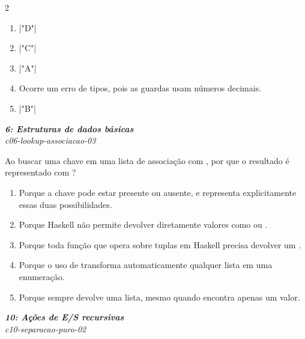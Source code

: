 \documentclass[a4paper,10pt,brazil]{article}
\begin{document}
\begin{multicols}{2}
\begin{enumerate}
  \item \haskellinline|"D"|

  \item \haskellinline|"C"|

  \item \haskellinline|"A"|

  \item Ocorre um erro de tipos, pois as guardas usam números decimais.

  \item \haskellinline|"B"|


\end{enumerate}

\begin{flushright}
  \footnotesize
  \textit{\textbf{6: Estruturas de dados básicas}}\\
  \textit{c06-lookup-associacao-03}\\

\end{flushright}
Ao buscar uma chave em uma lista de associação com , por que o resultado é representado com ?

\begin{enumerate}
  \item Porque a chave pode estar presente ou ausente, e  representa explicitamente essas duas possibilidades.

  \item Porque Haskell não permite devolver diretamente valores como  ou .

  \item Porque toda função que opera sobre tuplas em Haskell precisa devolver um .

  \item Porque o uso de  transforma automaticamente qualquer lista em uma enumeração.

  \item Porque  sempre devolve uma lista, mesmo quando encontra apenas um valor.


\end{enumerate}

\begin{flushright}
  \footnotesize
  \textit{\textbf{10: Ações de E/S recursivas}}\\
  \textit{c10-separacao-puro-02}\\


\end{flushright}
\end{multicols}
\end{document}
